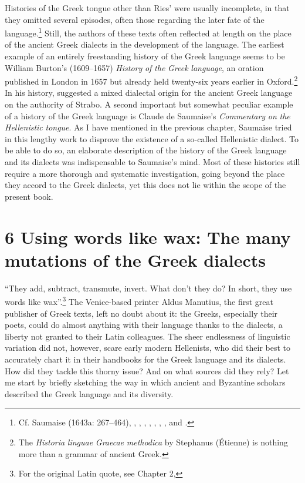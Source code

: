 \documentclass[output=paper]{langsci/langscibook}
\begin{document}
Histories of the Greek tongue other than Ries’ were usually incomplete, in that they omitted several episodes, often those regarding the later fate of the language.\footnote{Cf. Saumaise (1643a: 267–464), \citet{Burton1657}, \citet{LagerlööfPalmroot1685}, \citet{Rodigast1685}, \citet{Eling1691}, \citet{Florinus1707}, \citet{Reinhard1724}, \citet{MuntheHeiberg1748}, and \citet{Harles1778}.} Still, the authors of these texts often reflected at length on the place of the ancient Greek dialects in the development of the language. The earliest example of an entirely freestanding history of the Greek language seems to be William Burton’s (1609–1657) \textit{History} \textit{of} \textit{the} \textit{Greek} \textit{language}, an oration published in London in 1657 but already held twenty-six years earlier in Oxford.\footnote{The \textit{Historia} \textit{linguae} \textit{Graecae} \textit{methodica} by Stephanus (Étienne) \citet{Simon1615} is nothing more than a grammar of ancient Greek.} In his history, \citet[27]{Burton1657} suggested a mixed dialectal origin for the ancient Greek language on the authority of Strabo. A second important but somewhat peculiar example of a history of the Greek language is Claude de Saumaise’s \textit{Commentary} \textit{on} \textit{the} \textit{Hellenistic} \textit{tongue}. As I have mentioned in the previous chapter, Saumaise tried in this lengthy work to disprove the existence of a so-called Hellenistic dialect. To be able to do so, an elaborate description of the history of the Greek language and its dialects was indispensable to Saumaise’s mind. Most of these histories still require a more thorough and systematic investigation, going beyond the place they accord to the Greek dialects, yet this does not lie within the scope of the present book.

\section{6 Using words like wax: The many mutations of the Greek dialects}
\hypertarget{Toc19704843}{}\begin{styleCatalogusnotities}
“They add, subtract, transmute, invert. What don’t they do? In short, they use words like wax”.\footnote{ \textrm{For the original Latin quote, see Chapter 2, }} The Venice-based printer Aldus Manutius, the first great publisher of Greek texts, left no doubt about it: the Greeks, especially their poets, could do almost anything with their language thanks to the dialects, a liberty not granted to their Latin colleagues. The sheer endlessness of linguistic variation did not, however, scare early modern Hellenists, who did their best to accurately chart it in their handbooks for the Greek language and its dialects. How did they tackle this thorny issue? And on what sources did they rely? Let me start by briefly sketching the way in which ancient and Byzantine scholars described the Greek language and its diversity.
\end{styleCatalogusnotities}
\end{document}
